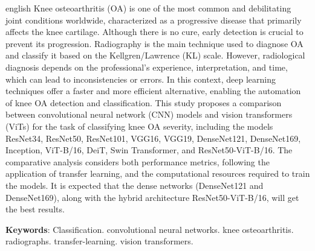 \begin{resumo}[Abstract]
 \begin{otherlanguage*}{english}
  Knee osteoarthritis (OA) is one of the most common and debilitating joint conditions worldwide, characterized as a progressive disease that primarily affects the knee cartilage. Although there is no cure, early detection is crucial to prevent its progression. Radiography is the main technique used to diagnose OA and classify it based on the Kellgren/Lawrence (KL) scale. However, radiological diagnosis depends on the professional's experience, interpretation, and time, which can lead to inconsistencies or errors. In this context, deep learning techniques offer a faster and more efficient alternative, enabling the automation of knee OA detection and classification. This study proposes a comparison between convolutional neural network (CNN) models and vision transformers (ViTs) for the task of classifying knee OA severity, including the models ResNet34, ResNet50, ResNet101, VGG16, VGG19, DenseNet121, DenseNet169, Inception, ViT-B/16, DeiT, Swin Transformer, and ResNet50-ViT-B/16. The comparative analysis considers both performance metrics, following the application of transfer learning, and the computational resources required to train the models. It is expected that the dense networks (DenseNet121 and DenseNet169), along with the hybrid architecture ResNet50-ViT-B/16, will get the best results.

   \vspace{\onelineskip}
 
   \noindent 
   \textbf{Keywords}: Classification. convolutional neural networks. knee osteoarthritis. radiographs. transfer-learning. vision transformers.
 \end{otherlanguage*}
\end{resumo}